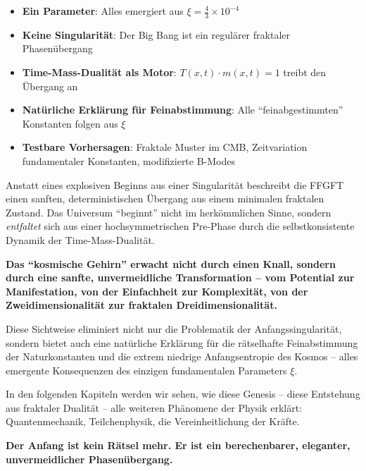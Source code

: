 	\begin{itemize}[leftmargin=*]
		\item \textbf{Ein Parameter}: Alles emergiert aus $\xi = \frac{4}{3} \times 10^{-4}$
		\item \textbf{Keine Singularität}: Der Big Bang ist ein regulärer fraktaler Phasenübergang
		\item \textbf{Time-Mass-Dualität als Motor}: $T(x,t) \cdot m(x,t) = 1$ treibt den Übergang an
		\item \textbf{Natürliche Erklärung für Feinabstimmung}: Alle \enquote{feinabgestimmten} Konstanten folgen aus $\xi$
		\item \textbf{Testbare Vorhersagen}: Fraktale Muster im CMB, Zeitvariation fundamentaler Konstanten, modifizierte B-Modes
	\end{itemize}
	
	Anstatt eines explosiven Beginns aus einer Singularität beschreibt die FFGFT einen sanften, deterministischen Übergang aus einem minimalen fraktalen Zustand. Das Universum \enquote{beginnt} nicht im herkömmlichen Sinne, sondern \textit{entfaltet} sich aus einer hochsymmetrischen Pre-Phase durch die selbstkonsistente Dynamik der Time-Mass-Dualität.
	
	\textbf{Das \enquote{kosmische Gehirn} erwacht nicht durch einen Knall, sondern durch eine sanfte, unvermeidliche Transformation -- vom Potential zur Manifestation, von der Einfachheit zur Komplexität, von der Zweidimensionalität zur fraktalen Dreidimensionalität.}
	
	Diese Sichtweise eliminiert nicht nur die Problematik der Anfangssingularität, sondern bietet auch eine natürliche Erklärung für die rätselhafte Feinabstimmung der Naturkonstanten und die extrem niedrige Anfangsentropie des Kosmos -- alles emergente Konsequenzen des einzigen fundamentalen Parameters $\xi$.
	
	In den folgenden Kapiteln werden wir sehen, wie diese Genesis -- diese Entstehung aus fraktaler Dualität -- alle weiteren Phänomene der Physik erklärt: Quantenmechanik, Teilchenphysik, die Vereinheitlichung der Kräfte.
	
	\textbf{Der Anfang ist kein Rätsel mehr. Er ist ein berechenbarer, eleganter, unvermeidlicher Phasenübergang.}




